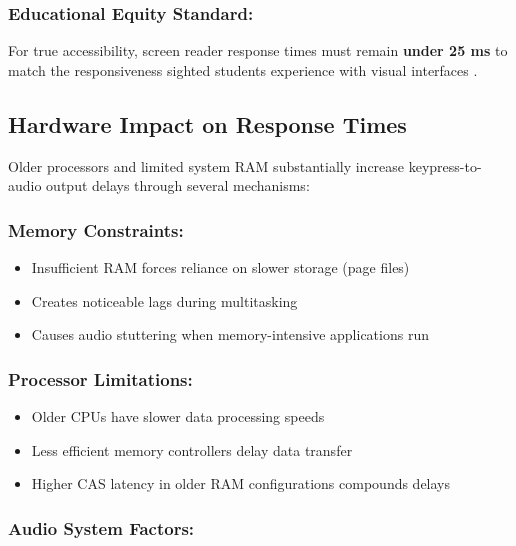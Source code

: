 \subsubsection{Educational Equity Standard:}

For true accessibility, screen reader response times must remain \textbf{under 25 ms} to match the responsiveness sighted students experience with visual interfaces \cite{W3C2018WCAG21}.

\subsection{Hardware Impact on Response Times}\label{hardware-impact-on-response-times}

Older processors and limited system RAM substantially increase keypress-to-audio output delays through several mechanisms:

\subsubsection{Memory Constraints:}

\begin{itemize}
\item Insufficient RAM forces reliance on slower storage (page files) \cite{Microsoft2023WindowsPerformance}
\item Creates noticeable lags during multitasking \cite{Intel2024ProcessorMemory}
\item Causes audio stuttering when memory-intensive applications run \cite{Realtek2023AudioDriverPerformance}
\end{itemize}


\subsubsection{Processor Limitations:}

\begin{itemize}
\item Older CPUs have slower data processing speeds \cite{AMD2024RyzenPerformance}
\item Less efficient memory controllers delay data transfer \cite{AnandTech2023MemoryControllers}
\item Higher CAS latency in older RAM configurations compounds delays \cite{TechSpot2023RAMTimings}
\end{itemize}


\subsubsection{Audio System Factors:}

